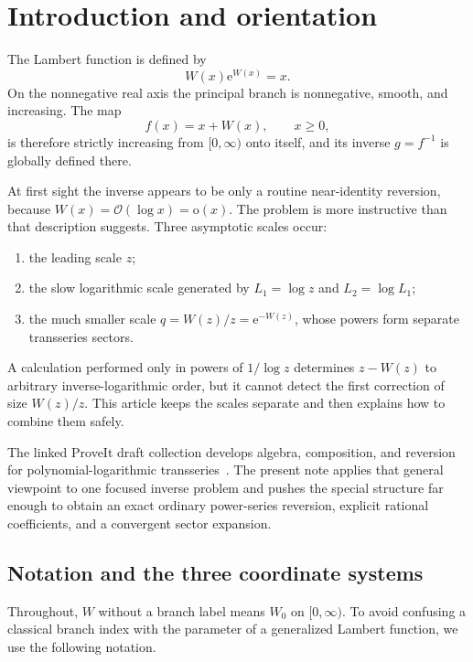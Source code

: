 \documentclass[11pt,a4paper]{article}
\numberwithin{equation}{section}
\theoremstyle{definition}
\theoremstyle{remark}
\newcommand{\e}{\mathrm e}
\newcommand{\Ord}{\mathcal O}
\newcommand{\littleo}{\mathrm o}
\newcommand{\Lone}{L_1}
\newcommand{\Ltwo}{L_2}
\begin{document}
\tableofcontents
\newpage

\section{Introduction and orientation}

The Lambert function is defined by
\begin{equation}\label{eq:W-def}
  W(x)\e^{W(x)}=x.
\end{equation}
On the nonnegative real axis the principal branch is nonnegative, smooth,
and increasing.  The map
\begin{equation}\label{eq:f-def}
  f(x)=x+W(x),\qquad x\ge0,
\end{equation}
is therefore strictly increasing from \([0,\infty)\) onto itself, and its
inverse \(g=f^{-1}\) is globally defined there.

At first sight the inverse appears to be only a routine near-identity
reversion, because \(W(x)=\Ord(\log x)=\littleo(x)\).  The problem is more
instructive than that description suggests.  Three asymptotic scales occur:
\begin{enumerate}
\item the leading scale \(z\);
\item the slow logarithmic scale generated by \(\Lone=\log z\) and
      \(\Ltwo=\log\Lone\);
\item the much smaller scale \(q=W(z)/z=\e^{-W(z)}\), whose powers form
      separate transseries sectors.
\end{enumerate}
A calculation performed only in powers of \(1/\log z\) determines
\(z-W(z)\) to arbitrary inverse-logarithmic order, but it cannot detect the
first correction of size \(W(z)/z\).  This article keeps the scales
separate and then explains how to combine them safely.

The linked ProveIt draft collection develops algebra, composition, and
reversion for polynomial-logarithmic transseries~\cite{ProveItTransseries}.  The present note applies
that general viewpoint to one focused inverse problem and pushes the
special structure far enough to obtain an exact ordinary power-series
reversion, explicit rational coefficients, and a convergent sector
expansion.

\subsection{Notation and the three coordinate systems}

Throughout, \(W\) without a branch label means \(W_0\) on
\([0,\infty)\).  To avoid confusing a classical branch index with the
parameter of a generalized Lambert function, we use the following notation.
\end{document}
